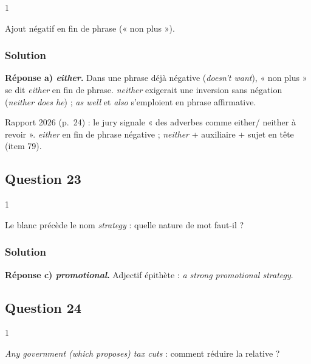 \documentclass[11pt,a4paper]{article}
\begin{document}
\begin{indication}{1}

Ajout négatif en fin de phrase (« non plus »).

\end{indication}

\hypertarget{solution-21}{%
\subsubsection{Solution}\label{solution-21}}

\textbf{Réponse a) \emph{either}.} Dans une phrase déjà négative (\emph{doesn't want}), « non plus » se dit \emph{either} en fin de phrase. \emph{neither} exigerait une inversion sans négation (\emph{neither does he}) ; \emph{as well} et \emph{also} s'emploient en phrase affirmative.

\begin{jury}

Rapport 2026 (p.~24) : le jury signale « des adverbes comme either/ neither à revoir ». \emph{either} en fin de phrase négative ; \emph{neither} + auxiliaire + sujet en tête (item 79).

\end{jury}

\hypertarget{question-23}{%
\subsection{Question 23}\label{question-23}}

\begin{indication}{1}

Le blanc précède le nom \emph{strategy} : quelle nature de mot faut-il ?

\end{indication}

\hypertarget{solution-22}{%
\subsubsection{Solution}\label{solution-22}}

\textbf{Réponse c) \emph{promotional}.} Adjectif épithète : \emph{a strong promotional strategy}.

\hypertarget{question-24}{%
\subsection{Question 24}\label{question-24}}

\begin{indication}{1}

\emph{Any government (which proposes) tax cuts} : comment réduire la relative ?

\end{indication}
\end{document}
